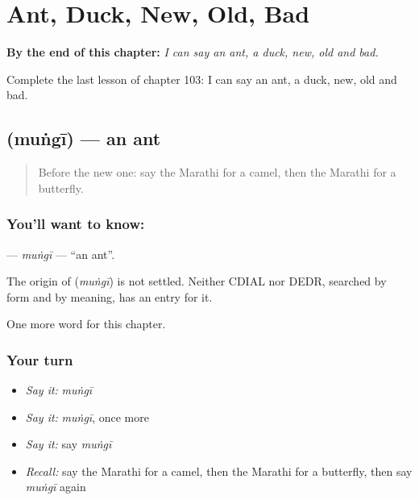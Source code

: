 
\chapter{Ant, Duck, New, Old, Bad}
\label{ch:mr-ant-duck-new-old-bad}

\begin{chapteropening}
\textbf{By the end of this chapter:} \emph{I can say an ant, a duck, new, old and bad.}

Complete the last lesson of chapter 103: I can say an ant, a duck, new, old and bad.
\end{chapteropening}

\section[\texorpdfstring{\mr{मुंगी} (muṅgī)}{मुंगी (muṅgī)}]{ (muṅgī) — an ant}

\label{lesson:MR-C103-mungi}



\begin{quote}
Before the new one: say the Marathi for a camel, then the Marathi for a butterfly.
\end{quote}

\subsection*{You'll want to know: }
\textbf{} — \emph{muṅgī} — \textquotedblleft{}an ant\textquotedblright{}.

\begin{cousinweb}
The origin of \textbf{} (\emph{muṅgī}) is not settled. Neither CDIAL nor DEDR, searched by form and by meaning, has an entry for it.
\end{cousinweb}

\begin{grammarlens}[title={What you've built}]
One more word for this chapter.
\end{grammarlens}

\subsection*{Your turn}
\begin{itemize}
\raggedright
  \item \emph{Say it:} \emph{muṅgī}
  \item \emph{Say it:} \emph{muṅgī}, once more
  \item \emph{Say it:} say \emph{muṅgī}
  \item \emph{Recall:} say the Marathi for a camel, then the Marathi for a butterfly, then say \emph{muṅgī} again
\end{itemize}

